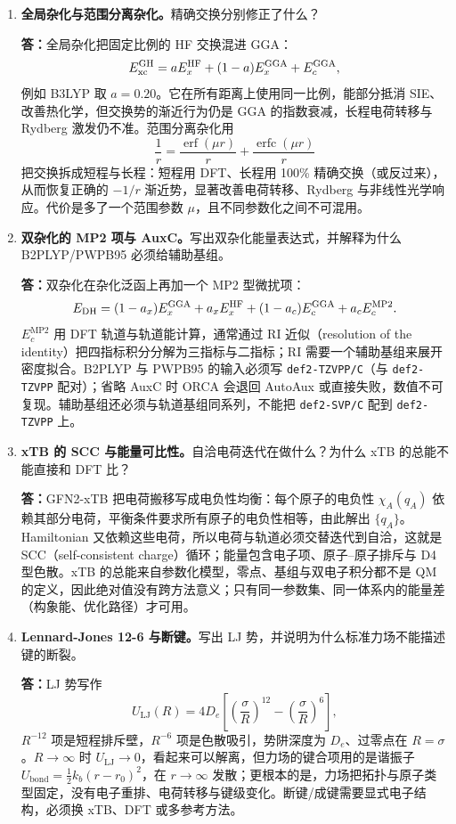 \begin{enumerate}[label=\textbf{\arabic*.}, leftmargin=2.2em, itemsep=6pt]
\item \textbf{全局杂化与范围分离杂化。}精确交换分别修正了什么？

\textbf{答：}全局杂化把固定比例的 HF 交换混进 GGA：
\[
E_{\mathrm{xc}}^{\mathrm{GH}}=aE_x^{\mathrm{HF}}+(1-a)E_x^{\mathrm{GGA}}+E_c^{\mathrm{GGA}},
\]
例如 B3LYP 取 $a=0.20$。它在所有距离上使用同一比例，能部分抵消 SIE、改善热化学，但交换势的渐近行为仍是 GGA 的指数衰减，长程电荷转移与 Rydberg 激发仍不准。范围分离杂化用
\[
\frac1r=\frac{\operatorname{erf}(\mu r)}{r}+\frac{\operatorname{erfc}(\mu r)}{r}
\]
把交换拆成短程与长程：短程用 DFT、长程用 100\% 精确交换（或反过来），从而恢复正确的 $-1/r$ 渐近势，显著改善电荷转移、Rydberg 与非线性光学响应\citep{becke1993b3lyp,adamo1999pbe0,mardirossian2016wb97mv}。代价是多了一个范围参数 $\mu$，且不同参数化之间不可混用。

\item \textbf{双杂化的 MP2 项与 AuxC。}写出双杂化能量表达式，并解释为什么 B2PLYP/PWPB95 必须给辅助基组。

\textbf{答：}双杂化在杂化泛函上再加一个 MP2 型微扰项：
\[
E_{\mathrm{DH}}=(1-a_x)E_x^{\mathrm{GGA}}+a_xE_x^{\mathrm{HF}}
+(1-a_c)E_c^{\mathrm{GGA}}+a_cE_c^{\mathrm{MP2}}.
\]
$E_c^{\mathrm{MP2}}$ 用 DFT 轨道与轨道能计算，通常通过 RI 近似（resolution of the identity）把四指标积分分解为三指标与二指标；RI 需要一个辅助基组来展开密度拟合。B2PLYP 与 PWPB95 的输入必须写 \texttt{def2-TZVPP/C}（与 \texttt{def2-TZVPP} 配对）；省略 AuxC 时 ORCA 会退回 AutoAux 或直接失败，数值不可复现。辅助基组还必须与轨道基组同系列，不能把 \texttt{def2-SVP/C} 配到 \texttt{def2-TZVPP} 上\citep{grimme2006b2plyp,goerigk2011pwpb95,weigend2006aux}。

\item \textbf{xTB 的 SCC 与能量可比性。}自洽电荷迭代在做什么？为什么 xTB 的总能不能直接和 DFT 比？

\textbf{答：}GFN2-xTB 把电荷搬移写成电负性均衡：每个原子的电负性 $\chi_A(q_A)$ 依赖其部分电荷，平衡条件要求所有原子的电负性相等，由此解出 $\{q_A\}$。Hamiltonian 又依赖这些电荷，所以电荷与轨道必须交替迭代到自洽，这就是 SCC（self-consistent charge）循环；能量包含电子项、原子--原子排斥与 D4 型色散。xTB 的总能来自参数化模型，零点、基组与双电子积分都不是 QM 的定义，因此绝对值没有跨方法意义；只有同一参数集、同一体系内的能量差（构象能、优化路径）才可用\citep{bannwarth2019gfn2}。

\item \textbf{Lennard-Jones 12-6 与断键。}写出 LJ 势，并说明为什么标准力场不能描述键的断裂。

\textbf{答：}LJ 势写作
\[
U_{\mathrm{LJ}}(R)=4D_e\left[\left(\frac{\sigma}{R}\right)^{12}-\left(\frac{\sigma}{R}\right)^{6}\right],
\]
$R^{-12}$ 项是短程排斥壁，$R^{-6}$ 项是色散吸引，势阱深度为 $D_e$、过零点在 $R=\sigma$。$R\to\infty$ 时 $U_{\mathrm{LJ}}\to0$，看起来可以解离，但力场的键合项用的是谐振子 $U_{\mathrm{bond}}=\tfrac12k_b(r-r_0)^2$，在 $r\to\infty$ 发散；更根本的是，力场把拓扑与原子类型固定，没有电子重排、电荷转移与键级变化。断键/成键需要显式电子结构，必须换 xTB、DFT 或多参考方法\citep{lennardjones1931,spicher2020gfnff}。

\end{enumerate}
